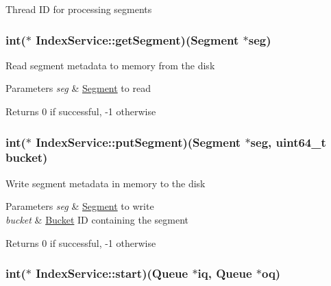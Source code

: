 \-Thread \-I\-D for processing segments \hypertarget{structIndexService_a7fb12b4cc7c9eae4c2fab7ba2ae3d42e}{
\subsubsection[{get\-Segment}]{\setlength{\rightskip}{0pt plus 5cm}int($\ast$ {\bf \-Index\-Service\-::get\-Segment})({\bf \-Segment} $\ast$seg)}}\label{structIndexService_a7fb12b4cc7c9eae4c2fab7ba2ae3d42e}
\-Read segment metadata to memory from the disk 
\begin{DoxyParams}{\-Parameters}
{\em seg} & \hyperlink{structSegment}{\-Segment} to read \\
\hline
\end{DoxyParams}
\begin{DoxyReturn}{\-Returns}
0 if successful, -\/1 otherwise 
\end{DoxyReturn}
\hypertarget{structIndexService_a20dc255b29cc383c1fe7b3a547afa7e8}{
\subsubsection[{put\-Segment}]{\setlength{\rightskip}{0pt plus 5cm}int($\ast$ {\bf \-Index\-Service\-::put\-Segment})({\bf \-Segment} $\ast$seg, uint64\-\_\-t bucket)}}\label{structIndexService_a20dc255b29cc383c1fe7b3a547afa7e8}
\-Write segment metadata in memory to the disk 
\begin{DoxyParams}{\-Parameters}
{\em seg} & \hyperlink{structSegment}{\-Segment} to write \\
\hline
{\em bucket} & \hyperlink{structBucket}{\-Bucket} \-I\-D containing the segment \\
\hline
\end{DoxyParams}
\begin{DoxyReturn}{\-Returns}
0 if successful, -\/1 otherwise 
\end{DoxyReturn}
\hypertarget{structIndexService_ad8d158bb13eeacdec8f716c65dfa78bc}{
\subsubsection[{start}]{\setlength{\rightskip}{0pt plus 5cm}int($\ast$ {\bf \-Index\-Service\-::start})({\bf \-Queue} $\ast$iq, {\bf \-Queue} $\ast$oq)}}\label{structIndexService_ad8d158bb13eeacdec8f716c65dfa78bc}

